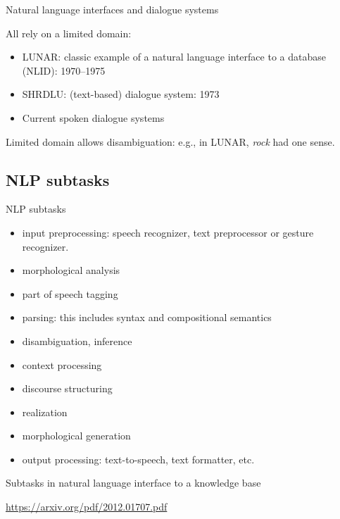 \documentclass[compress]{beamer}
\begin{document}
\begin{frame}{Natural language interfaces and dialogue systems}

  All rely on a limited domain:
  \begin{itemize}
  \item LUNAR: classic example of a natural language interface to a
    database (NLID): 1970--1975
  \item SHRDLU: (text-based) dialogue system: 1973
  \item Current spoken dialogue systems
  \end{itemize}

  Limited domain allows disambiguation: e.g., in LUNAR, {\it rock} had
  one sense.
\end{frame}

\subsection{NLP subtasks}

\begin{frame}{NLP subtasks}
  \begin{itemize}
  \item input preprocessing: speech recognizer, text preprocessor or
    gesture recognizer.
  \item morphological analysis
  \item part of speech tagging 
  \item parsing: this includes syntax and compositional semantics
  \item disambiguation, inference 
  \item context processing 
  \item discourse structuring
  \item realization 
  \item morphological generation
  \item output processing: text-to-speech, text formatter, etc.
  \end{itemize}
\end{frame}

\begin{frame}{Subtasks in natural language interface to a knowledge base}

  \url{https://arxiv.org/pdf/2012.01707.pdf}

\end{frame}
\end{document}
